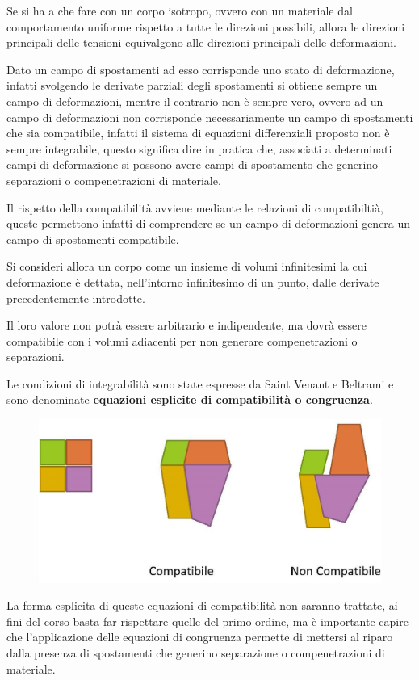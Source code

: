 \documentclass{article}
\begin{document}
\begin{adjustwidth}{2in}{}
	Se si ha a che fare con un corpo isotropo, ovvero con un materiale dal comportamento uniforme rispetto a tutte le direzioni possibili, allora le direzioni principali delle tensioni equivalgono alle direzioni principali delle deformazioni. \newline  
	
	Dato un campo di spostamenti ad esso corrisponde uno stato di
	deformazione, infatti svolgendo le derivate parziali degli spostamenti si ottiene sempre un campo di deformazioni, mentre il contrario non è sempre vero, ovvero ad un campo di deformazioni non corrisponde necessariamente un campo di
	spostamenti che sia compatibile, infatti il sistema di equazioni differenziali proposto non è sempre integrabile, questo significa dire in pratica che, associati a determinati campi di deformazione si possono avere campi di spostamento che generino separazioni o compenetrazioni di materiale. \newline 
	
	Il rispetto della compatibilità avviene mediante le relazioni di compatibiltià, queste permettono infatti di comprendere se un campo di deformazioni genera un campo di spostamenti compatibile. \newline
	
	Si consideri allora un corpo come un insieme di volumi infinitesimi la cui deformazione
	è dettata, nell’intorno infinitesimo di un punto, dalle derivate precedentemente introdotte.
	
	Il loro valore non potrà essere arbitrario e indipendente, ma dovrà essere
	compatibile con i volumi adiacenti per non generare compenetrazioni o
	separazioni.

	Le condizioni di integrabilità sono state espresse da Saint
	Venant e Beltrami e
	sono denominate \textbf{equazioni esplicite di compatibilità o congruenza}.

\begin{figure}[H]
	\centering
	\includegraphics[width=0.4\linewidth]{immagini/1.PARTE7_Pagina_31}
\end{figure}

	La forma esplicita di queste equazioni di compatibilità non saranno trattate, ai fini del corso basta far rispettare quelle del primo ordine, ma è importante capire che l'applicazione delle equazioni di congruenza permette di mettersi al riparo dalla presenza di spostamenti che generino separazione o compenetrazioni di materiale. \newline 


\end{adjustwidth}
\end{document}
